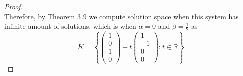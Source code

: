 \documentclass[11pt]{scrartcl}
\begin{document}
\begin{enumerate}[label=\alph*.]
{\begin{proof}
$$		      $$
		      Therefore, by Theorem 3.9 we compute solution space when this system has infinite amount of solutions, which is when $\alpha = 0$ and $\beta = \frac12$ as
		      \[
			      K=
			      \left\{
			      \begin{pmatrix}
				      1 \\
				      0 \\
				      1 \\
				      0
			      \end{pmatrix}+
			      t\begin{pmatrix}
				      1  \\
				      -1 \\
				      0  \\
				      0
			      \end{pmatrix}: t \in \mathbb{R}
			      \right\}
		      \]
	      \end{proof}
	      }
\end{enumerate}

\end{document}
